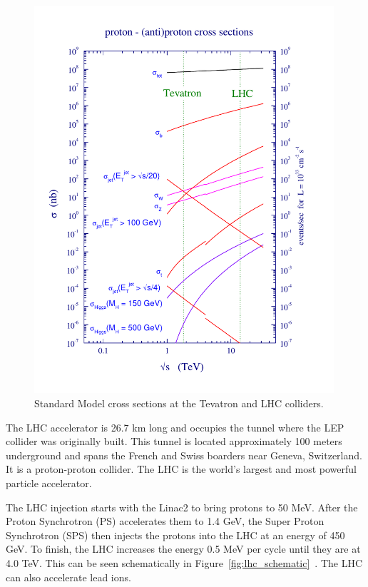 \begin{figure}[htb]                                                               
\begin{center}
\includegraphics[width=0.99\textwidth]{Experiment/lhcolor.pdf}
\end{center}
\vspace*{-1cm}
\caption{Standard Model cross sections at the Tevatron
and LHC colliders.~\cite{Campbell:2006wx}}
\label{fig:lhcall}                    
\end{figure} 



The LHC accelerator is 26.7 km long and occupies the tunnel where the LEP collider was originally built.  This tunnel is located approximately 100 meters underground and spans the French and Swiss boarders near Geneva, Switzerland.  It is a proton-proton collider. The LHC is the world's largest and most powerful particle accelerator. \cite{LHCDesignReport}

The LHC injection starts with the Linac2 to bring protons to 50 MeV.  After the Proton Synchrotron (PS) accelerates them to 1.4 GeV, the Super Proton Synchrotron (SPS) then injects the protons into the LHC at an energy of 450 GeV.  To finish, the LHC increases the energy 0.5 MeV per cycle until they are at 4.0 TeV.  This can be seen schematically in Figure~\ref{fig:lhc_schematic}~\cite{CERN_complex}. The LHC can also accelerate lead ions.

